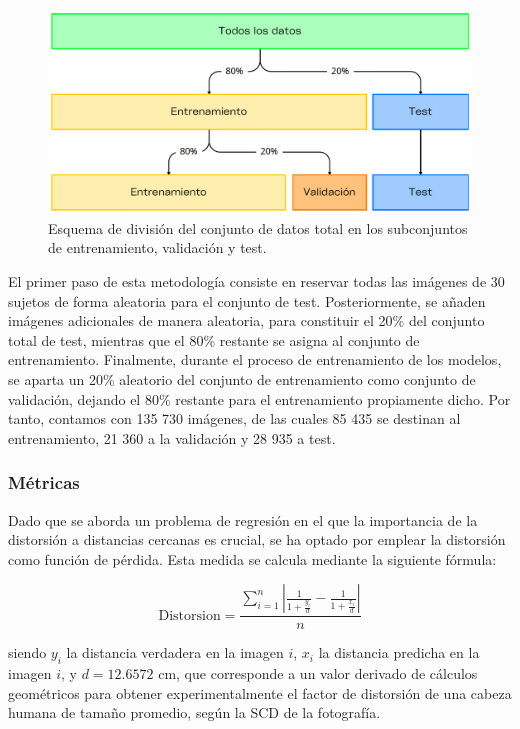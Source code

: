 \begin{figure}[h]
	\centering
	\includegraphics[scale=0.55]{imagenes/cap5/hold-out.png}
	\caption[Esquema de división del conjunto de datos.]{Esquema de división del conjunto de datos total en los subconjuntos de entrenamiento, validación y test.}
	\label{fig27}
\end{figure}

El primer paso de esta metodología consiste en reservar todas las imágenes de 30 sujetos de forma aleatoria para el conjunto de test. Posteriormente, se añaden imágenes adicionales de manera aleatoria, para constituir el 20\% del conjunto total de test, mientras que el 80\% restante se asigna al conjunto de entrenamiento. Finalmente, durante el proceso de entrenamiento de los modelos, se aparta un 20\% aleatorio del conjunto de entrenamiento como conjunto de validación, dejando el 80\% restante para el entrenamiento propiamente dicho. Por tanto, contamos con 135 730 imágenes, de las cuales 85 435 se destinan al entrenamiento, 21 360 a la validación y 28 935 a test.


\subsubsection{Métricas}

Dado que se aborda un problema de regresión en el que la importancia de la distorsión a distancias cercanas es crucial, se ha optado por emplear la distorsión como función de pérdida. Esta medida se calcula mediante la siguiente fórmula:

\begin{equation}
	\text{Distorsion} = \displaystyle \frac{\sum_{i=1}^{n} | \displaystyle \frac{1}{1 + \displaystyle \frac{y_i}{d}} - \displaystyle \frac{1}{1 + \displaystyle \frac{x_i}{d}}|}{n}
\end{equation}

siendo $y_i$ la distancia verdadera en la imagen $i$, $x_i$ la distancia predicha en la imagen $i$, y $d = 12.6572 $ cm, que corresponde a un valor derivado de cálculos geométricos \cite{55} para obtener experimentalmente el factor de distorsión de una cabeza humana de tamaño promedio, según la SCD de la fotografía.

